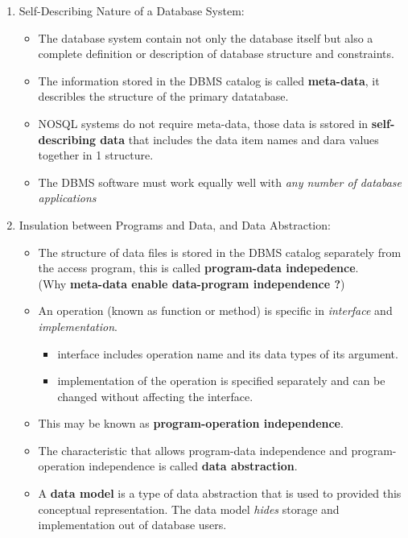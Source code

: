 \documentclass[10pt]{article}
\begin{document}
\begin{enumerate}
	\begin{enumerate}
		\item Self-Describing Nature of a Database System:
		\begin{itemize}
			\item The database system contain not only the database itself but also a complete definition or description of database structure and constraints.
			\item The information stored in the DBMS catalog is called \textbf{meta-data}, it describles the structure of the primary datatabase.
			\item NOSQL systems do not require meta-data, those data is sstored in \textbf{self-describing data} that includes the data item names and dara values together in 1 structure.
			\item The DBMS software must work equally well with \textit{any number of database applications}
		\end{itemize}

		\item Insulation between Programs and Data, and Data Abstraction:
		\begin{itemize}
			\item The structure of data files is stored in the DBMS catalog separately from the access program, this is called \textbf{program-data indepedence}. \\
			(Why \textbf{meta-data enable data-program independence ?})
			\item An operation (known as function or method) is specific in \textit{interface} and \textit{implementation}.

			\begin{itemize}
				\item interface includes operation name and its data types of its argument.
				\item implementation of the operation is specified separately and can be changed without affecting the interface.
			\end{itemize}

			\item This may be known as \textbf{program-operation independence}.
			\item The characteristic that allows program-data independence and program-operation independence is called \textbf{data abstraction}.
			\item A \textbf{data model} is a type of data abstraction that is used to provided this conceptual representation. The data model \textit{hides} storage and implementation out of database users.  
		\end{itemize}


\end{enumerate}
\end{enumerate}
\end{document}
